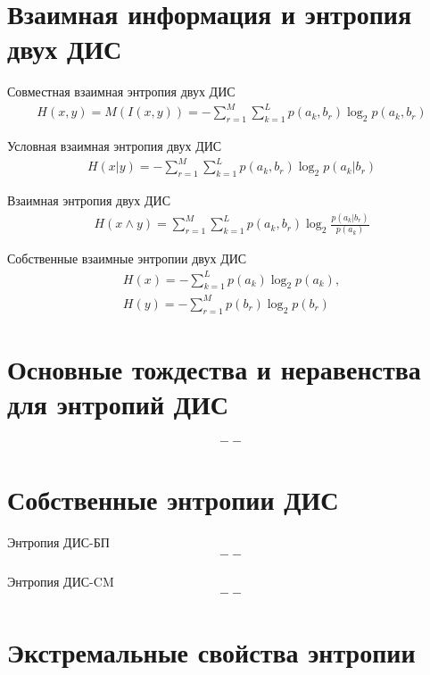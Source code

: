 \section{Взаимная информация и энтропия двух ДИС}

Совместная взаимная энтропия двух ДИС
\begin{align}
	H(x, y) = M(I(x, y)) = -\sum_{r=1}^{M} \sum_{k=1}^{L} p(a_k, b_r)\log_{2}{p(a_k, b_r)}
\end{align}

Условная взаимная энтропия двух ДИС
\begin{align}
	H(x | y) = -\sum_{r=1}^{M} \sum_{k=1}^{L} p(a_k, b_r)\log_{2}{p(a_k | b_r)}
\end{align}

Взаимная энтропия двух ДИС
\begin{align}
	H(x \wedge y) = \sum_{r=1}^{M} \sum_{k=1}^{L} p(a_k, b_r)\log_{2}{\frac{p(a_k | b_r)}{p(a_k)}}
\end{align}

Собственные взаимные энтропии двух ДИС
\begin{gather}
	H(x) = -\sum_{k=1}^{L} p(a_k)\log_{2}{p(a_k)}, \\
	H(y) = -\sum_{r=1}^{M} p(b_r)\log_{2}{p(b_r)} \nonumber
\end{gather}

\section{Основные тождества и неравенства для энтропий ДИС}

\begin{align}
	--
\end{align}

\section{Собственные энтропии ДИС}

Энтропия ДИС-БП
\begin{align}
	--
\end{align}

Энтропия ДИС-CM
\begin{align}
	--
\end{align}

\section{Экстремальные свойства энтропии}

